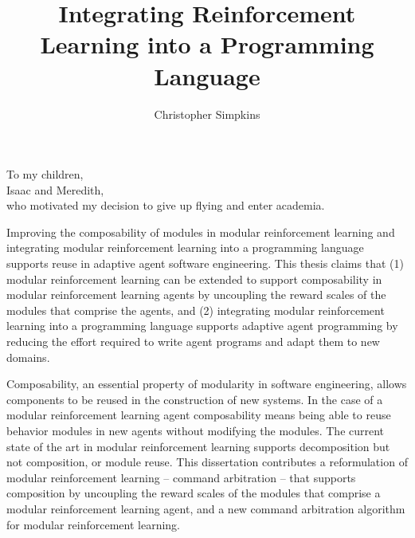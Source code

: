 \documentclass[12pt]{gatech-thesis}
\title{Integrating Reinforcement Learning into a Programming Language}
\author{Christopher Simpkins}
\begin{document}
\nocite{*}

\begin{preliminary}
\begin{dedication}
\null\vfil
{\large
\begin{center}
To my children,\\\vspace{12pt}
Isaac and Meredith,\\\vspace{12pt}
who motivated my decision to give up flying and enter academia.
\end{center}}
\vfil\null
\end{dedication}


\contents

\begin{summary}
\vspace{-1in}

Improving the composability of modules in modular reinforcement learning and integrating modular reinforcement learning into a programming language supports reuse in adaptive agent software engineering.  This thesis claims that (1) modular reinforcement learning can be extended to support composability in modular reinforcement learning agents by uncoupling the reward scales of the modules that comprise the agents, and (2) integrating modular reinforcement learning into a programming language supports adaptive agent programming by reducing the effort required to write agent programs and adapt them to new domains.

Composability, an essential property of modularity in software engineering, allows components to be reused in the construction of new systems.  In the case of a modular reinforcement learning agent composability means being able to reuse behavior modules in new agents without modifying the modules.  The current state of the art in modular reinforcement learning supports decomposition but not composition, or module reuse.  This dissertation contributes a reformulation of modular reinforcement learning -- command arbitration -- that supports composition by uncoupling the reward scales of the modules that comprise a modular reinforcement learning agent, and a new command arbitration algorithm for modular reinforcement learning.


\end{summary}
\end{preliminary}
\end{document}
